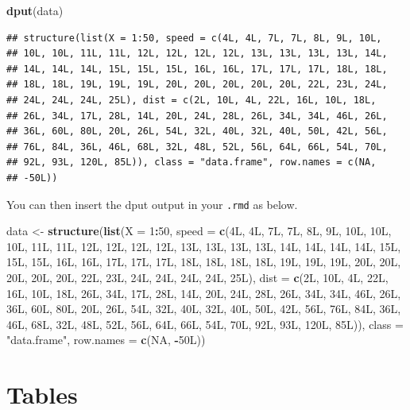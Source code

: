 \documentclass[
  12pt,
]{article}
\newenvironment{Shaded}{\begin{snugshade}}{\end{snugshade}}
\newcommand{\DataTypeTok}[1]{\textcolor[rgb]{0.13,0.29,0.53}{#1}}
\newcommand{\DecValTok}[1]{\textcolor[rgb]{0.00,0.00,0.81}{#1}}
\newcommand{\KeywordTok}[1]{\textcolor[rgb]{0.13,0.29,0.53}{\textbf{#1}}}
\newcommand{\NormalTok}[1]{#1}
\newcommand{\OperatorTok}[1]{\textcolor[rgb]{0.81,0.36,0.00}{\textbf{#1}}}
\newcommand{\OtherTok}[1]{\textcolor[rgb]{0.56,0.35,0.01}{#1}}
\newcommand{\StringTok}[1]{\textcolor[rgb]{0.31,0.60,0.02}{#1}}
\begin{document}
\begin{Shaded}
\begin{Highlighting}[]
\KeywordTok{dput}\NormalTok{(data)}
\end{Highlighting}
\end{Shaded}

\begin{verbatim}
## structure(list(X = 1:50, speed = c(4L, 4L, 7L, 7L, 8L, 9L, 10L, 
## 10L, 10L, 11L, 11L, 12L, 12L, 12L, 12L, 13L, 13L, 13L, 13L, 14L, 
## 14L, 14L, 14L, 15L, 15L, 15L, 16L, 16L, 17L, 17L, 17L, 18L, 18L, 
## 18L, 18L, 19L, 19L, 19L, 20L, 20L, 20L, 20L, 20L, 22L, 23L, 24L, 
## 24L, 24L, 24L, 25L), dist = c(2L, 10L, 4L, 22L, 16L, 10L, 18L, 
## 26L, 34L, 17L, 28L, 14L, 20L, 24L, 28L, 26L, 34L, 34L, 46L, 26L, 
## 36L, 60L, 80L, 20L, 26L, 54L, 32L, 40L, 32L, 40L, 50L, 42L, 56L, 
## 76L, 84L, 36L, 46L, 68L, 32L, 48L, 52L, 56L, 64L, 66L, 54L, 70L, 
## 92L, 93L, 120L, 85L)), class = "data.frame", row.names = c(NA, 
## -50L))
\end{verbatim}

You can then insert the dput output in your \texttt{.rmd} as below.

\begin{Shaded}
\begin{Highlighting}[]
\NormalTok{data <-}\StringTok{ }\KeywordTok{structure}\NormalTok{(}\KeywordTok{list}\NormalTok{(}\DataTypeTok{X =} \DecValTok{1}\OperatorTok{:}\DecValTok{50}\NormalTok{, }\DataTypeTok{speed =} \KeywordTok{c}\NormalTok{(4L, 4L, 7L, 7L, 8L, 9L, 10L, }
\NormalTok{10L, 10L, 11L, 11L, 12L, 12L, 12L, 12L, 13L, 13L, 13L, 13L, 14L, }
\NormalTok{14L, 14L, 14L, 15L, 15L, 15L, 16L, 16L, 17L, 17L, 17L, 18L, 18L, }
\NormalTok{18L, 18L, 19L, 19L, 19L, 20L, 20L, 20L, 20L, 20L, 22L, 23L, 24L, }
\NormalTok{24L, 24L, 24L, 25L), }\DataTypeTok{dist =} \KeywordTok{c}\NormalTok{(2L, 10L, 4L, 22L, 16L, 10L, 18L, }
\NormalTok{26L, 34L, 17L, 28L, 14L, 20L, 24L, 28L, 26L, 34L, 34L, 46L, 26L, }
\NormalTok{36L, 60L, 80L, 20L, 26L, 54L, 32L, 40L, 32L, 40L, 50L, 42L, 56L, }
\NormalTok{76L, 84L, 36L, 46L, 68L, 32L, 48L, 52L, 56L, 64L, 66L, 54L, 70L, }
\NormalTok{92L, 93L, 120L, 85L)), }
\DataTypeTok{class =} \StringTok{"data.frame"}\NormalTok{, }\DataTypeTok{row.names =} \KeywordTok{c}\NormalTok{(}\OtherTok{NA}\NormalTok{, }
\OperatorTok{-}\NormalTok{50L))}
\end{Highlighting}
\end{Shaded}

\hypertarget{sec:tables}{%
\section{Tables}\label{sec:tables}}
\end{document}
